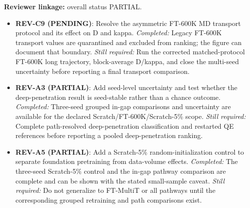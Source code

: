 \textbf{Reviewer linkage:} overall status PARTIAL.
\begin{itemize}[leftmargin=1.4em,noitemsep]
\item \textbf{REV-C9 (PENDING)}: Resolve the asymmetric FT-600K MD transport protocol and its effect on D and kappa. \emph{Completed:} Legacy FT-600K transport values are quarantined and excluded from ranking; the figure can document that boundary. \emph{Still required:} Run the corrected matched-protocol FT-600K long trajectory, block-average D/kappa, and close the multi-seed uncertainty before reporting a final transport comparison.
\item \textbf{REV-A3 (PARTIAL)}: Add seed-level uncertainty and test whether the deep-penetration result is seed-stable rather than a chance outcome. \emph{Completed:} Three-seed grouped in-gap comparisons and uncertainty are available for the declared Scratch/FT-600K/Scratch-5\% scope. \emph{Still required:} Complete path-resolved deep-penetration classification and restarted QE references before reporting a pooled deep-penetration ranking.
\item \textbf{REV-A5 (PARTIAL)}: Add a Scratch-5\% random-initialization control to separate foundation pretraining from data-volume effects. \emph{Completed:} The three-seed Scratch-5\% control and the in-gap pathway comparison are complete and can be shown with the stated small-sample caveat. \emph{Still required:} Do not generalize to FT-MultiT or all pathways until the corresponding grouped retraining and path comparisons exist.
\end{itemize}
